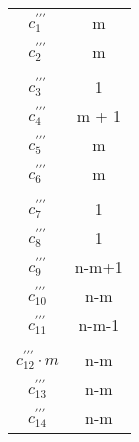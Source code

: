 \documentclass{article}
\begin{document}
    \begin{minipage}{0.70\textwidth}
        
    \end{minipage}
    \hfill
    \begin{minipage}{0.25\textwidth}
        \begin{tabular}{|c|c}
            $c^{\prime\prime\prime}_1            $ & m     \\
            $c^{\prime\prime\prime}_2            $ & m     \\
            $                                    $ &       \\
            $c^{\prime\prime\prime}_3            $ & 1     \\
            $c^{\prime\prime\prime}_4            $ & m + 1 \\
            $c^{\prime\prime\prime}_5            $ & m     \\
            $c^{\prime\prime\prime}_6            $ & m     \\
            $                                    $ &       \\
            $c^{\prime\prime\prime}_7            $ & 1     \\
            $c^{\prime\prime\prime}_8            $ & 1     \\
            $c^{\prime\prime\prime}_9            $ & n-m+1 \\
            $c^{\prime\prime\prime}_{10}         $ & n-m   \\
            $c^{\prime\prime\prime}_{11}         $ & n-m-1 \\
            $                                    $ &       \\
            $c^{\prime\prime\prime}_{12} \cdot m $ & n-m   \\
            $c^{\prime\prime\prime}_{13}         $ & n-m   \\
            $c^{\prime\prime\prime}_{14}         $ & n-m   \\

        \end{tabular}
    \end{minipage}
\end{document}
